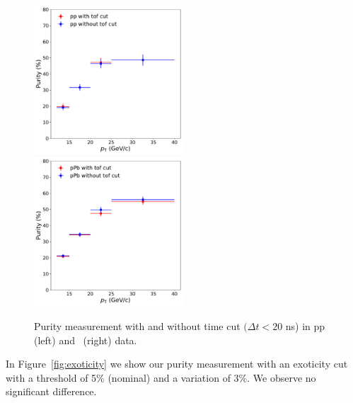 \begin{figure}
	\center
	\includegraphics[width=0.495\textwidth]{Appendices/pptof.pdf}
	\includegraphics[width=0.495\textwidth]{Appendices/ppbtof.pdf}
	\caption{Purity measurement with and without time cut $(\Delta t<20$ ns) in pp (left) and \pPb~(right) data.}
	\label{fig:TOF}
\end{figure}

In Figure~\ref{fig:exoticity} we show our purity measurement with an exoticity cut with a threshold of 5\% (nominal) and a variation of $3\%$. We observe no significant difference. 

